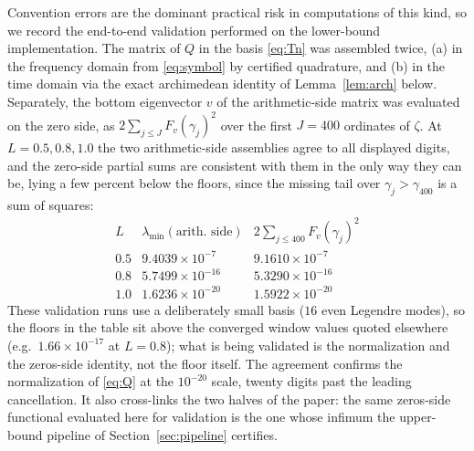 ﻿\documentclass[11pt]{article}
\newcommand{\lammin}{\lambda_{\min}}
\begin{document}
Convention errors are the dominant practical risk in computations of
this kind, so we record the end-to-end validation performed on the
lower-bound implementation.  The matrix of $Q$ in the basis
\eqref{eq:Tn} was assembled twice, (a) in the frequency domain from
\eqref{eq:symbol} by certified quadrature, and (b) in the time domain
via the exact archimedean identity of Lemma~\ref{lem:arch} below.
Separately, the bottom eigenvector $v$ of the arithmetic-side matrix
was evaluated on the zero side, as $2\sum_{j\le J}F_v(\gamma_j)^2$
over the first $J=400$ ordinates of $\zeta$.  At $L=0.5,0.8,1.0$ the
two arithmetic-side assemblies agree to all displayed digits, and the
zero-side partial sums are consistent with them in the only way they
can be, lying a few percent below the floors, since the missing tail
over $\gamma_j>\gamma_{400}$ is a sum of squares:
\[
\begin{array}{c|cc}
L & \lammin(\text{arith.\ side}) & 2\sum_{j\le400}F_v(\gamma_j)^2\\
\hline
0.5 & 9.4039\times10^{-7} & 9.1610\times10^{-7}\\
0.8 & 5.7499\times10^{-16} & 5.3290\times10^{-16}\\
1.0 & 1.6236\times10^{-20} & 1.5922\times10^{-20}
\end{array}
\]
These validation runs use a deliberately small basis ($16$ even
Legendre modes), so the floors in the table sit above the converged
window values quoted elsewhere (e.g.\ $1.66\times10^{-17}$ at
$L=0.8$); what is being validated is the normalization and the
zeros-side identity, not the floor itself.  The agreement confirms
the normalization of \eqref{eq:Q} at the $10^{-20}$
scale, twenty digits past the leading cancellation.  It also cross-links the
two halves of the paper: the same zeros-side functional evaluated here
for validation is the one whose infimum the upper-bound pipeline of
Section~\ref{sec:pipeline} certifies.
\end{document}
